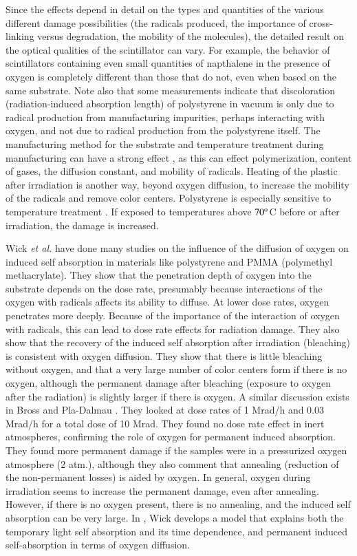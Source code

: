 Since the effects depend in detail on the types and quantities
of the various different damage possibilities (the radicals produced,
the importance of cross-linking versus degradation, the mobility of
the molecules), the detailed result on the optical qualities
of the scintillator can vary.
For example, the behavior of scintillators
containing even small quantities of napthalene in the presence of oxygen is completely
different than those that do not, even when based
on the same substrate\cite{Wick1991472}.
Note also that some measurements \cite{todd} indicate
that discoloration (radiation-induced absorption length) 
of polystyrene in vacuum is only due
to radical production from manufacturing impurities, perhaps
interacting with oxygen, and not due to radical production
from the polystyrene itself.
The manufacturing method for the substrate
and temperature treatment during manufacturing
can have a strong effect \cite{bicken} \cite{johnson},
as this can effect polymerization, content of gases, the
diffusion constant, and mobility of radicals.  Heating
of the plastic after irradiation is another way, beyond
oxygen diffusion, to increase
the mobility of the radicals and remove color centers.
Polystyrene is especially sensitive to temperature treatment
\cite{bicken}.  If exposed to temperatures above ${\rm 70^o}$C
before or after irradiation, the damage is increased.

Wick {\it{et al.}} \cite{Wick1991472}
have done many studies on the influence of the diffusion of oxygen on
induced self absorption
in materials like polystyrene and PMMA
(polymethyl methacrylate).  
They show that the penetration depth of oxygen into the substrate
depends on the dose rate, presumably because interactions
of the oxygen with radicals affects its ability to diffuse.  
At lower dose rates, oxygen penetrates
more deeply.  Because of the importance of the interaction
of oxygen with radicals, this can lead to dose rate effects
for radiation damage.  They also show that the recovery of the
induced self absorption after irradiation (bleaching)
is consistent with
oxygen diffusion.  They show that there is little bleaching
without oxygen, and that a very large number of color centers
form if there is no oxygen, although the permanent damage after
bleaching (exposure to oxygen after the radiation) is slightly
larger if there is oxygen.
A similar discussion exists in Bross and Pla-Dalmau \cite{173178}.
They looked at dose rates of 1 Mrad/h and 0.03 Mrad/h for a
total dose of 10 Mrad.  They found no dose rate effect in
inert atmospheres, confirming the role of oxygen for permanent
induced absorption.  They found more permanent damage if the samples
were in a pressurized oxygen atmosphere (2 atm.), although
they also comment that annealing (reduction of the non-permanent losses)
is aided by oxygen.
In general, oxygen during irradiation seems to increase the permanent
damage, even after annealing.  However, if there is no oxygen present,
there is no annealing, and the induced self absorption can be very large.
In \cite{Wulkop1995141}, Wick develops a model that explains
both the temporary light self absorption
and its time dependence, and permanent induced self-absorption in
terms of oxygen diffusion.

